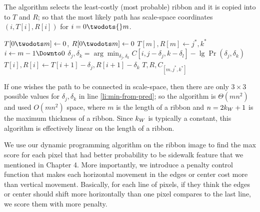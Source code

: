 The  algorithm selects the least-costly (most probable) ribbon and it is copied into to $T$ and $R$; so that the most likely path has scale-space coordinates $(i, T[i], R[i])$ for $i=0\twodots{}m$. 



\begin{codebox}
 \label{alg:backtrack-ribbon}
\li $T{[0{\twodots}m]} \gets 0$, \quad $R{[0{\twodots}m]} \gets 0$             
\li $T{[m]}, R{[m]} \gets j^*, k^*$ \label{li:backtrack-best-last}
\li \For $i \gets m-1 \Downto 0$ \Do
\li      $\delta_j, \delta_k = \displaystyle{\arg\min_{\delta_j,\delta_k}C{[i,j{-}\delta_j,k{-}\delta_l]}{-}\lg \Pr(\delta_j,\delta_k)}$
\li      $T{[i]}, R[i] \gets T{[i+1]}-\delta_j, R{[i+1]}-\delta_k$                                                 \label{li:backtack-choose-pred}
    \End
\li \Return $T, R, C_{[m, j^*, k^*]}$
\end{codebox}


If one wishes the path to be connected in scale-space, then there are only $3\times3$ possible values for $\delta_j, \delta_k$ in line \ref{li:min-from-pred}; so the algorithm is $\Theta(m n^2)$ and used $O(m n^2)$ space, where $m$ is the length of a ribbon and $n=2k_W+1$ is the maximum thickness of a ribbon. Since $k_W$ is typically a constant, this algorithm is effectively linear on the length of a ribbon.

We use our dynamic programming algorithm on the ribbon image to find the max score for each pixel that had better probability to be sidewalk feature that we mentioned in Chapter 4. 
More importantly, we introduce a penalty control function that makes each horizontal movement in the edges or center cost more than vertical movement. Basically, for each line of pixels, if they think the edges or center should shift more horizontally than one pixel compares to the last line, we score them with more penalty. 

